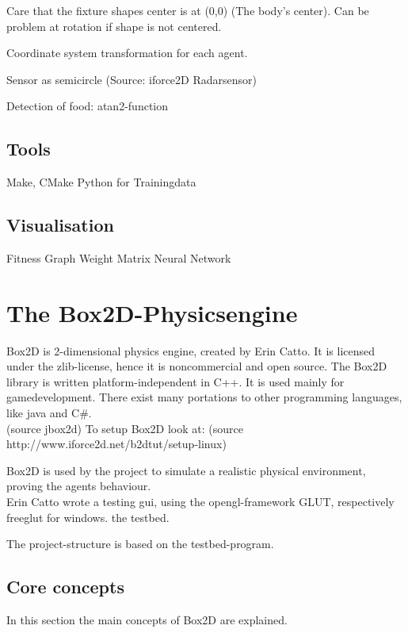 \documentclass[10pt,a4paper,DIV=11]{scrreprt}
\begin{document}
Care that the fixture shapes center is at (0,0) (The body's center). Can be problem at rotation if shape is not centered.

Coordinate system transformation for each agent.

Sensor as semicircle (Source: iforce2D Radarsensor)

Detection of food: atan2-function

\section{Tools}
Make, CMake
Python for Trainingdata

\section{Visualisation}

Fitness Graph
Weight Matrix
Neural Network





\chapter{The Box2D-Physicsengine}
Box2D is 2-dimensional physics engine, created by Erin Catto. It is licensed under the zlib-license, hence it is noncommercial and open source. The Box2D library is written platform-independent in C++. It is used mainly for gamedevelopment. There exist many portations to other programming languages, like java and C\#. \\
(source jbox2d)
To setup Box2D look at:
(source http://www.iforce2d.net/b2dtut/setup-linux)

Box2D is used by the project to simulate a realistic physical environment, proving the agents behaviour. \\

Erin Catto wrote a testing gui, using the opengl-framework GLUT, respectively freeglut for windows. the testbed.

The project-structure is based on the testbed-program.


\section{Core concepts}
In this section the main concepts of Box2D are explained.
\end{document}
